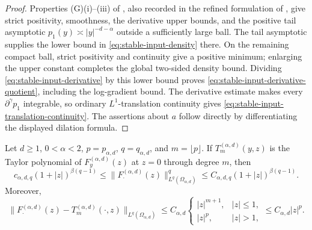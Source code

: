 \begin{proof}
Properties (G)(i)--(iii) of \cite{IshigeKawakamiMichihisa2017}, also recorded
in the refined formulation of
\cite{IshigeKawakamiMichihisa2022RefinedFractional}, give strict positivity,
smoothness, the derivative upper bounds, and the positive tail asymptotic
\(p_1(y)\asymp |y|^{-d-\alpha}\) outside a sufficiently large ball.  The
tail asymptotic supplies the lower bound in
\eqref{eq:stable-input-density} there.  On the remaining compact ball,
strict positivity and continuity give a positive minimum; enlarging the
upper constant completes the global two-sided density bound.  Dividing
\eqref{eq:stable-input-derivative} by this lower bound proves
\eqref{eq:stable-input-derivative-quotient}, including the log-gradient
bound.  The derivative estimate makes every \(\partial^\gamma p_1\)
integrable, so ordinary \(L^1\)-translation continuity gives
\eqref{eq:stable-input-translation-continuity}.  The assertions about \(a\)
follow directly by differentiating the displayed dilation formula.
\end{proof}

\begin{lemma}
\label{lem:stable-critical-translation-remainder}
Let \(d\ge1\), \(0<\alpha<2\), \(p=p_{\alpha,d}\),
\(q=q_{\alpha,d}\), and \(m=\lfloor p\rfloor\).  If
\(T_m^{(\alpha,d)}(y,z)\) is the Taylor polynomial of
\(F_y^{(\alpha,d)}(z)\) at \(z=0\) through degree \(m\), then
\begin{equation}\label{eq:stable-translation-lq-growth}
 c_{\alpha,d,q}(1+|z|)^{\beta(q-1)}
 \le \|F_\cdot^{(\alpha,d)}(z)\|_{L^q(\Omega_{\alpha,d})}^q
 \le C_{\alpha,d,q}(1+|z|)^{\beta(q-1)}.
\end{equation}
Moreover,
\begin{equation}\label{eq:stable-critical-global-remainder}
 \|F_\cdot^{(\alpha,d)}(z)-T_m^{(\alpha,d)}(\cdot,z)\|_{L^q(\Omega_{\alpha,d})}
 \le C_{\alpha,d}
 \begin{cases}
  |z|^{m+1},&|z|\le1,\\
  |z|^p,&|z|>1,
 \end{cases}
 \le C_{\alpha,d}|z|^p.
\end{equation}
\end{lemma}

